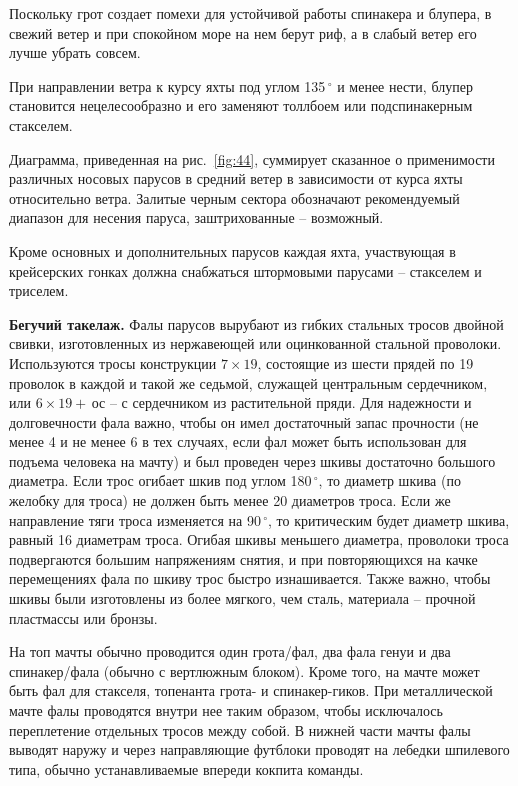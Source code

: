 \documentclass[a4paper, 12pt, twoside, final, book, russian, fittopage, cyremdash]{ncc}
\newcommand{\gr}{\ensuremath{\,^\circ}\xspace}
\newcommand{\ris}[1]{\ref{fig:#1}}
\begin{document}
Поскольку грот создает помехи для устойчивой работы спинакера и блупера, в свежий ветер и при спокойном море на нем берут риф, а в слабый ветер его лучше убрать совсем. 

При направлении ветра к курсу яхты под углом 135\gr и менее нести, блупер становится нецелесообразно и его заменяют толлбоем или подспинакерным стакселем.
 
Диаграмма, приведенная на рис.~\ris{44}, суммирует сказанное о применимости различных носовых парусов в средний ветер в зависимости от курса яхты относительно ветра. Залитые черным сектора обозначают рекомендуемый диапазон для несения паруса, заштрихованные \--- возможный.

Кроме основных и дополнительных парусов каждая яхта, участвующая в крейсерских гонках должна снабжаться штормовыми парусами \--- стакселем и триселем. 

\textbf{Бегучий такелаж.} Фалы парусов вырубают из гибких стальных тросов двойной свивки, изготовленных из нержавеющей или оцинкованной стальной проволоки. Используются тросы конструкции $7 \times 19$, состоящие из шести прядей по 19 проволок в каждой и такой же седьмой, служащей центральным сердечником, или $6 \times 19 + $\,ос \--- с сердечником из растительной пряди. Для надежности и долговечности фала важно, чтобы он имел достаточный запас прочности (не менее 4 и не менее 6 в тех случаях, если фал может быть использован для подъема человека на мачту) и был проведен через шкивы достаточно большого диаметра. Если трос огибает шкив под углом 180\gr, то диаметр шкива (по желобку для троса) не должен быть менее 20 диаметров троса. Если же направление тяги троса изменяется на 90\gr, то критическим будет диаметр шкива, равный 16 диаметрам троса. Огибая шкивы меньшего диаметра, проволоки троса подвергаются большим напряжениям снятия, и при повторяющихся на качке перемещениях фала по шкиву трос быстро изнашивается. Также важно, чтобы шкивы были изготовлены из более мягкого, чем сталь, материала \--- прочной пластмассы или бронзы. 

На топ мачты обычно проводится один грота\-/фал, два фала генуи и два спинакер\-/фала (обычно с вертлюжным блоком). Кроме того, на мачте может быть фал для стакселя, топенанта грота- и спинакер-гиков. При металлической мачте фалы проводятся внутри нее таким образом, чтобы исключалось переплетение отдельных тросов между собой. В нижней части мачты фалы выводят наружу и через направляющие футблоки проводят на лебедки шпилевого типа, обычно устанавливаемые впереди кокпита команды. 
\end{document}
